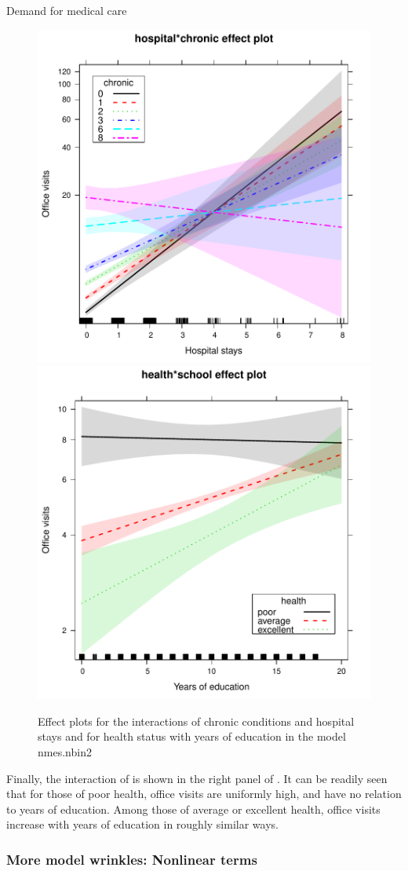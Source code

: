 \documentclass[11pt]{book}\usepackage[]{graphicx}\usepackage[]{color}
\newenvironment{knitrout}{}{} %
\renewenvironment{knitrout}{\small\renewcommand{\baselinestretch}{.85}}{} %
\begin{document}
\begin{Example}[nmes2a]{Demand for medical care}
\begin{knitrout}
\begin{figure}[!htbp]
\centerline{\includegraphics[width=.49\textwidth]{ch09/fig/nmes2-eff4-1} 
\includegraphics[width=.49\textwidth]{ch09/fig/nmes2-eff4-2} }

\caption[Effect plots for the interactions of chronic conditions and hospital stays and for health status with years of education in the model nmes]{Effect plots for the interactions of chronic conditions and hospital stays and for health status with years of education in the model nmes.nbin2\label{fig:nmes2-eff4}}
\end{figure}


\end{knitrout}

Finally, the interaction of  is shown in the right panel of
. It
can be readily seen that for those of poor health, office visits are
uniformly high, and have no relation to years of education. Among
those of average or excellent health, office visits increase with years
of education in roughly similar ways.
\end{Example}

\subsubsection{More model wrinkles: Nonlinear terms}
\end{document}
